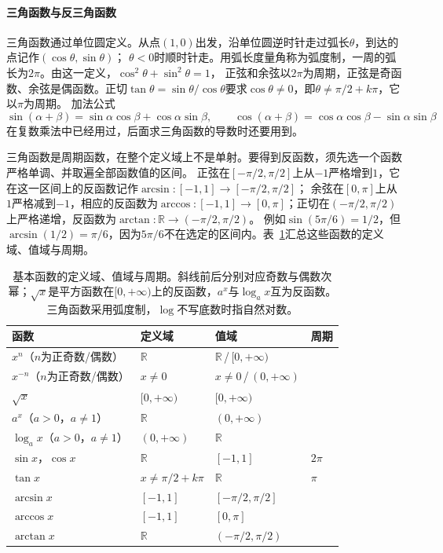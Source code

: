 \paragraph{三角函数与反三角函数}
三角函数通过单位圆定义。从点$(1,0)$出发，沿单位圆逆时针走过弧长$\theta$，到达的点记作$(\cos\theta,\sin\theta)$；
$\theta<0$时顺时针走。用弧长度量角称为弧度制，一周的弧长为$2\pi$。由这一定义，$\cos^2\theta+\sin^2\theta=1$，
正弦和余弦以$2\pi$为周期，正弦是奇函数、余弦是偶函数。正切$\tan\theta=\sin\theta/\cos\theta$要求$\cos\theta\neq0$，即$\theta\neq\pi/2+k\pi$，它以$\pi$为周期。
加法公式
\[
 \sin(\alpha+\beta)=\sin\alpha\cos\beta+\cos\alpha\sin\beta,\qquad
 \cos(\alpha+\beta)=\cos\alpha\cos\beta-\sin\alpha\sin\beta
\]
在复数乘法中已经用过，后面求三角函数的导数时还要用到。

三角函数是周期函数，在整个定义域上不是单射。要得到反函数，须先选一个函数严格单调、并取遍全部函数值的区间。
正弦在$[-\pi/2,\pi/2]$上从$-1$严格增到$1$，它在这一区间上的反函数记作$\arcsin:[-1,1]\to[-\pi/2,\pi/2]$；
余弦在$[0,\pi]$上从$1$严格减到$-1$，相应的反函数为$\arccos:[-1,1]\to[0,\pi]$；正切在$(-\pi/2,\pi/2)$上严格递增，反函数为$\arctan:\mathbb R\to(-\pi/2,\pi/2)$。
例如$\sin(5\pi/6)=1/2$，但$\arcsin(1/2)=\pi/6$，因为$5\pi/6$不在选定的区间内。表~\ref{tab:ru-elementary-functions}汇总这些函数的定义域、值域与周期。

\begin{table}[htbp]
 \centering\small
 \begin{tabular}{@{}llll@{}}
 \toprule
 函数 & 定义域 & 值域 & 周期\\
 \midrule
 $x^n$（$n$为正奇数/偶数） & $\mathbb R$ & $\mathbb R$\,/\,$[0,+\infty)$ & \\
 $x^{-n}$（$n$为正奇数/偶数） & $x\neq0$ & $x\neq0$\,/\,$(0,+\infty)$ & \\
 $\sqrt x$ & $[0,+\infty)$ & $[0,+\infty)$ & \\
 $a^x$（$a>0$，$a\neq1$） & $\mathbb R$ & $(0,+\infty)$ & \\
 $\log_ax$（$a>0$，$a\neq1$） & $(0,+\infty)$ & $\mathbb R$ & \\
 $\sin x$，$\cos x$ & $\mathbb R$ & $[-1,1]$ & $2\pi$\\
 $\tan x$ & $x\neq\pi/2+k\pi$ & $\mathbb R$ & $\pi$\\
 $\arcsin x$ & $[-1,1]$ & $[-\pi/2,\pi/2]$ & \\
 $\arccos x$ & $[-1,1]$ & $[0,\pi]$ & \\
 $\arctan x$ & $\mathbb R$ & $(-\pi/2,\pi/2)$ & \\
 \bottomrule
 \end{tabular}
 \caption{基本函数的定义域、值域与周期。斜线前后分别对应奇数与偶数次幂；$\sqrt x$是平方函数在$[0,+\infty)$上的反函数，$a^x$与$\log_ax$互为反函数。三角函数采用弧度制，$\log$不写底数时指自然对数。}
 \label{tab:ru-elementary-functions}
\end{table}

